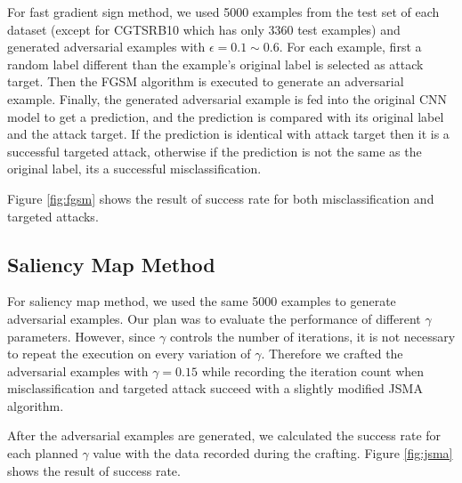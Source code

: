 \documentclass{article}
\begin{document}
For fast gradient sign method, we used 5000 examples from the test set of each dataset (except for CGTSRB10 which has only 3360 test examples)
and generated adversarial examples with \(\epsilon=0.1 \sim 0.6\).
For each example, first a random label different than the example's original label is selected as attack target.
Then the FGSM algorithm is executed to generate an adversarial example.
Finally, the generated adversarial example is fed into the original CNN model to get a prediction,
and the prediction is compared with its original label and the attack target.
If the prediction is identical with attack target then it is a successful targeted attack,
otherwise if the prediction is not the same as the original label, its a successful misclassification.

Figure \ref{fig:fgsm} shows the result of success rate for both misclassification and targeted attacks.

\subsection{Saliency Map Method}

For saliency map method, we used the same 5000 examples to generate adversarial examples.
Our plan was to evaluate the performance of different \(\gamma\) parameters.
However, since \(\gamma\) controls the number of iterations, it is not necessary to repeat the execution
on every variation of \(\gamma\). 
Therefore we crafted the adversarial examples with \(\gamma=0.15\) while 
recording the iteration count when misclassification and targeted attack succeed with a slightly modified JSMA algorithm.

After the adversarial examples are generated, we calculated the success rate for each planned \(\gamma\) value
with the data recorded during the crafting. Figure \ref{fig:jsma} shows the result of success rate.
\end{document}
